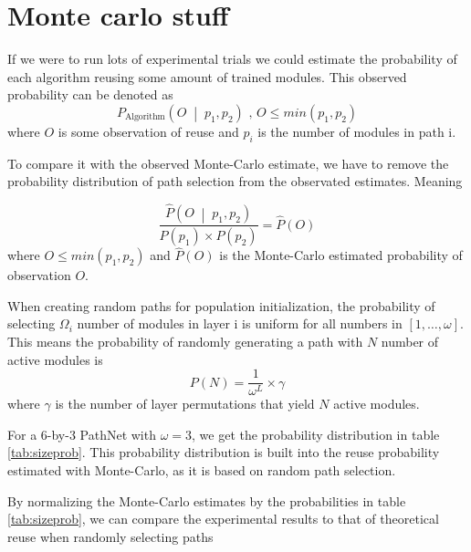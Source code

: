 \chapter{Monte carlo stuff}
If we were to run lots of experimental trials we could estimate the probability of each algorithm reusing some amount of trained modules. This observed probability can be denoted as
\begin{equation*}
    P_{\text{Algorithm}}\left(O\;\middle|\;p_{1}, p_{2}\right)\text{ ,  } O\leq min(p_{1}, p_{2})
\end{equation*}
where \(O\) is some observation of reuse and \(p_{i}\) is the number of modules in path i.

To compare it with the observed Monte-Carlo estimate, we have to remove the probability distribution of path selection from the observated estimates. Meaning

\begin{equation}
\frac{\hat{P}\left(O\;\middle|\;p_{1}, p_{2}\right)}{P(p_{1})\times P(p_{2})} = \hat{P}(O)
\label{eq:probabilityreuse}
\end{equation}
where \(O\leq min(p_{1}, p_{2})\) and \(\hat{P}(O)\) is the Monte-Carlo estimated probability of observation \(O\).

When creating random paths for population initialization, the probability of selecting \(\Omega_{i}\) number of modules in layer i is uniform for all numbers in \([1, \dots, \omega]\). This means the probability of randomly generating a path with \(N\) number of active modules is 
\begin{equation}
    P(N)=\frac{1}{\omega^{L}}\times\gamma    
\end{equation}
where \(\gamma\) is the number of layer permutations that yield \(N\) active modules. 



For a 6-by-3 PathNet with \(\omega=3\), we get the probability distribution in table \ref{tab:sizeprob}. This probability distribution is built into the reuse probability estimated with Monte-Carlo, as it is based on random path selection.

By normalizing the Monte-Carlo estimates by the probabilities in table \ref{tab:sizeprob}, we can compare the experimental results to that of theoretical reuse when randomly selecting paths